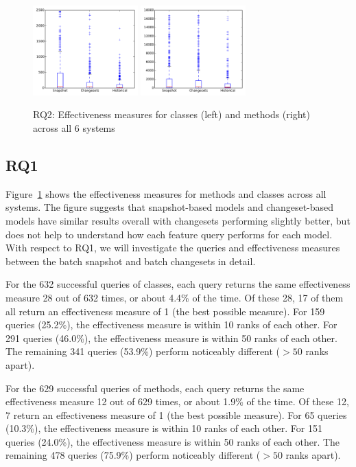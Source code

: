 \begin{figure}[t]
\centering
\includegraphics[width=0.36\textwidth]{figures/rq2-overall-class}
\includegraphics[width=0.36\textwidth]{figures/rq2-overall-method}
\caption{RQ2: Effectiveness measures for classes (left) and methods (right) across all 6 systems}
\label{fig:em}
\end{figure}

\subsection{RQ1}

Figure~\ref{fig:em} shows the effectiveness measures for methods and classes
across all systems. The figure suggests that snapshot-based models and
changeset-based models have similar results overall with changesets performing
slightly better, but does not help to understand how each feature query performs
for each model.  With respect to RQ1, we will investigate the queries and
effectiveness measures between the batch snapshot and batch changesets in
detail.

For the 632 successful queries of classes, each query returns the same
effectiveness measure 28 out of 632 times, or about 4.4\% of the time.  Of these
28, 17 of them all return an effectiveness measure of 1 (the best possible
measure).  For 159 queries (25.2\%), the effectiveness measure is within 10
ranks of each other.  For 291 queries (46.0\%), the effectiveness measure is
within 50 ranks of each other.  The remaining 341 queries (53.9\%) perform
noticeably different ($> 50$ ranks apart).

For the 629 successful queries of methods, each query returns the same
effectiveness measure 12 out of 629 times, or about 1.9\% of the time.  Of these
12, 7 return an effectiveness measure of 1 (the best possible measure).  For 65
queries (10.3\%), the effectiveness measure is within 10 ranks of each other.
For 151 queries (24.0\%), the effectiveness measure is within 50 ranks of each
other.  The remaining 478 queries (75.9\%) perform noticeably different ($> 50$
ranks apart).

